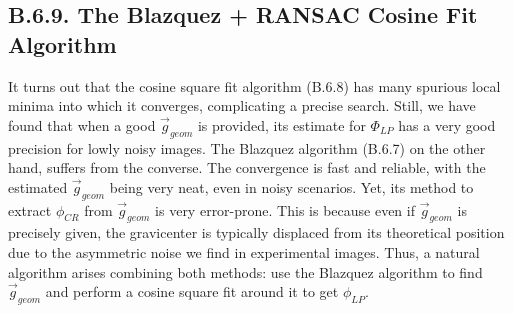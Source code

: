 \documentclass[11pt, a4paper, twoside]{article} %
\begin{document}
\vspace{-0.2cm}

\subsection*{B.6.9. The Blazquez + RANSAC Cosine Fit Algorithm}\vspace{-0.1cm}
It turns out that the cosine square fit algorithm (B.6.8) has many spurious local minima into which it converges, complicating a precise search. Still, we have found that when a good $\vec{g}_{geom}$ is provided, its estimate for $\Phi_{LP}$ has a very good precision for lowly noisy images. The Blazquez algorithm (B.6.7) on the other hand, suffers from the converse. The convergence is fast and reliable, with the estimated $\vec{g}_{geom}$ being very neat, even in noisy scenarios. Yet, its method to extract $\phi_{CR}$ from $\vec{g}_{geom}$ is very error-prone. This is because even if $\vec{g}_{geom}$ is precisely given, the gravicenter is typically displaced from its theoretical position due to the asymmetric noise we find in experimental images. Thus, a natural algorithm arises combining both methods: use the Blazquez algorithm to find $\vec{g}_{geom}$ and perform a cosine square fit around it to get $\phi_{LP}$.\vspace{-0.05cm}
\end{document}
